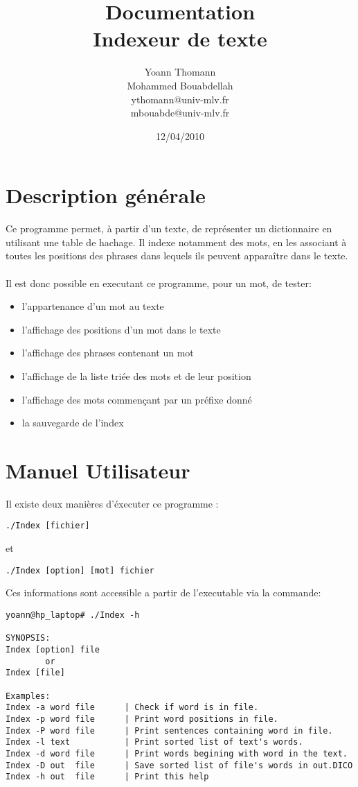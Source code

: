 \documentclass[french, 12pt, titlepage]{article}
\author{Yoann Thomann\\Mohammed Bouabdellah\\\scriptsize{ythomann@univ-mlv.fr}\\\scriptsize{mbouabde@univ-mlv.fr}}
\date{12/04/2010}
\title{\Huge Documentation\\Indexeur de texte}
\begin{document}
\vspace{\fill}
\maketitle
\newpage
\tableofcontents
\newpage
\section{Description générale}
Ce programme permet, à partir d'un texte, de représenter un
dictionnaire en utilisant une table de hachage. Il indexe notamment
des mots, en les associant à toutes les positions des phrases dans
lequels ils peuvent apparaître dans le texte. \\\\
Il est donc possible en executant ce programme, pour un mot, de
tester:
\begin{itemize}
\renewcommand{\labelitemi}{$\bullet$}
\item l'appartenance d'un mot au texte
\item l'affichage des positions d'un mot dans le texte
\item l'affichage des phrases contenant un mot
\item l'affichage de la liste triée des mots et de leur position
\item l'affichage des mots commençant par un préfixe donné
\item la sauvegarde de l'index
\end{itemize}

\section{Manuel Utilisateur}
Il existe deux manières d'éxecuter ce programme :
\begin{lstlisting}
./Index [fichier]
\end{lstlisting}
et
\begin{lstlisting}
./Index [option] [mot] fichier
\end{lstlisting}
Ces informations sont accessible a partir de l'executable via la
commande:
\begin{lstlisting}
yoann@hp_laptop# ./Index -h

SYNOPSIS:
Index [option] file
        or
Index [file]

Examples:
Index -a word file      | Check if word is in file.
Index -p word file      | Print word positions in file.
Index -P word file      | Print sentences containing word in file.
Index -l text           | Print sorted list of text's words.
Index -d word file      | Print words begining with word in the text.
Index -D out  file      | Save sorted list of file's words in out.DICO
Index -h out  file      | Print this help
\end{lstlisting}
\end{document}
